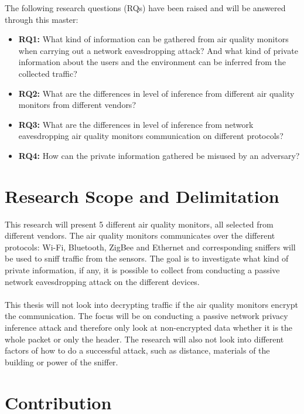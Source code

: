 The following research questions (RQs) have been raised and will be answered through this master:
\begin{itemize}
    \item 
    \textbf{RQ1:} What kind of information can be gathered from air quality monitors when carrying out a network eavesdropping attack? And what kind of private information about the users and the environment can be inferred from the collected traffic?\\
    \item 
    \textbf{RQ2:} What are the differences in level of inference from different air quality monitors from different vendors?\\
    \item
    \textbf{RQ3:} What are the differences in level of inference from network eavesdropping air quality monitors communication on different protocols?\\
    \item 
    \textbf{RQ4:} How can the private information gathered be misused by an adversary?\\
\end{itemize}

\section*{Research Scope and Delimitation}
This research will present 5 different air quality monitors, all selected from different vendors. The air quality monitors communicates over the different protocols: Wi-Fi, Bluetooth, ZigBee and Ethernet and corresponding sniffers will be used to sniff traffic from the sensors. The goal is to investigate what kind of private information, if any, it is possible to collect from conducting a passive network eavesdropping attack on the different devices. 
\\\\
This thesis will not look into decrypting traffic if the air quality monitors encrypt the communication. The focus will be on conducting a passive network privacy inference attack and therefore only look at non-encrypted data whether it is the whole packet or only the header. The research will also not look into different factors of how to do a successful attack, such as distance, materials of the building or power of the sniffer. 

\section*{Contribution}

